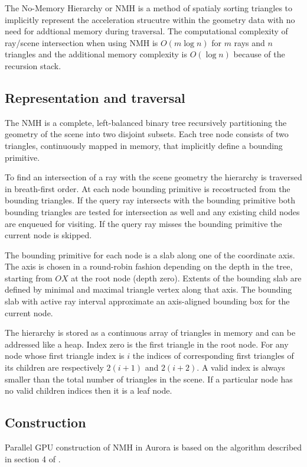 The No-Memory Hierarchy or NMH \parencite{eisemann2012} is a method of spatialy sorting triangles to implicitly represent the acceleration strucutre within the geometry data with no need for addtional memory during traversal. The computational complexity of ray/scene intersection when using NMH is $O(m \log n)$ for $m$ rays and $n$ triangles and the additional memory complexity is $O(\log n)$ because of the recursion stack.

\subsection{Representation and traversal}
The NMH is a complete, left-balanced binary tree recursively partitioning the geometry of the scene into two disjoint subsets. Each tree node consists of two triangles, continuously mapped in memory, that implicitly define a bounding primitive.

To find an intersection of a ray with the scene geometry the hierarchy is traversed in breath-first order. At each node bounding primitive is recostructed from the bounding triangles. If the query ray intersects with the bounding primitive both bounding triangles are tested for intersection as well and any existing child nodes are enqueued for visiting. If the query ray misses the bounding primitive the current node is skipped.

The bounding primitive for each node is a slab along one of the coordinate axis. The axis is chosen in a round-robin fashion depending on the depth in the tree, starting from $OX$ at the root node (depth zero). Extents of the bounding slab are defined by minimal and maximal triangle vertex along that axis. The bounding slab with active ray interval approximate an axis-aligned bounding box for the current node.

The hierarchy is stored as a continuous array of triangles in memory and can be addressed like a heap. Index zero is the first triangle in the root node. For any node whose first triangle index is $i$ the indices of corresponding first triangles of its children are respectively $2(i+1)$ and $2(i+2)$. A valid index is always smaller than the total number of triangles in the scene. If a particular node has no valid children indices then it is a leaf node.

\subsection{Construction}
Parallel GPU construction of NMH in Aurora is based on the algorithm described in section 4 of \cite{eisemann2012}.

